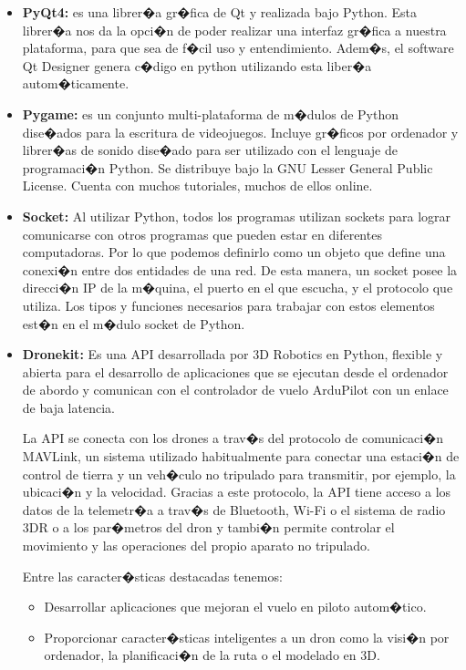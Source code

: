 \begin{itemize}
	\item \textbf{PyQt4: } es una librer�a gr�fica de Qt y realizada bajo Python. Esta librer�a nos da la opci�n de poder realizar una interfaz gr�fica a nuestra plataforma, para que sea de f�cil uso y entendimiento. Adem�s, el software Qt Designer genera c�digo en python utilizando esta liber�a autom�ticamente.
	
	\item \textbf{Pygame:} es un conjunto multi-plataforma de m�dulos de Python	dise�ados para la escritura de videojuegos. Incluye gr�ficos por ordenador y librer�as de sonido dise�ado para ser utilizado con el	lenguaje de programaci�n Python. Se distribuye bajo la GNU Lesser General Public License. Cuenta con muchos tutoriales, muchos de ellos online.
	
	\item \textbf{Socket:} Al utilizar Python, todos los programas utilizan sockets para lograr comunicarse con otros programas que pueden estar en	diferentes computadoras. Por lo que podemos definirlo como un	objeto que define una conexi�n entre dos entidades de una red. De esta manera, un socket posee la direcci�n IP de la m�quina, el puerto en el que escucha, y el protocolo que utiliza. Los tipos y	funciones necesarios para trabajar con estos elementos est�n en el m�dulo socket de Python.
	
	\item \textbf{Dronekit:} Es una API desarrollada por 3D Robotics en Python, flexible y abierta para el desarrollo de aplicaciones que se ejecutan desde el ordenador de abordo y comunican con el controlador de vuelo ArduPilot con un enlace de baja latencia.
	
	La API se conecta con los drones a trav�s del protocolo de comunicaci�n MAVLink, un sistema utilizado habitualmente para conectar una estaci�n de control de tierra y un veh�culo no tripulado para transmitir, por ejemplo, la ubicaci�n y la velocidad. Gracias a este protocolo, la API tiene acceso a los datos de la telemetr�a a trav�s de Bluetooth, Wi-Fi o el sistema de radio 3DR o a los par�metros del dron y tambi�n permite controlar el movimiento y las operaciones del propio aparato no tripulado.
	
	Entre las caracter�sticas destacadas tenemos:
	\begin{itemize}
		\item Desarrollar aplicaciones que mejoran el vuelo en piloto autom�tico.
		
		\item Proporcionar caracter�sticas inteligentes a un dron como la visi�n por ordenador, la planificaci�n de la ruta o el modelado en 3D.
		

\end{itemize}
\end{itemize}
